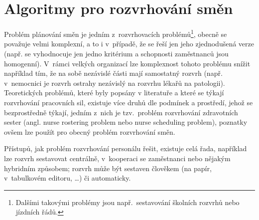 \documentclass[twoside]{ctuthesis}
\begin{document}
%
%
%


\chapter{Algoritmy pro rozvrhování směn}
Problém plánování směn je jedním z~rozvrhovacích problémů\footnote{Dalšími takovými problémy jsou např.~sestavování školních rozvrhů nebo jízdních řádů.}, obecně se považuje velmi komplexní, a to i v~případě, že se řeší jen jeho zjednodušená verze (např. se vyhodnocuje jen jedno kritérium a schopnosti zaměstnanců jsou homogenní). V~rámci velkých organizací lze komplexnost tohoto problému snížit například tím, že na sobě nezávislé části mají samostatný rozvrh (např. v~nemocnici je rozvrh ostrahy nezávislý na rozvrhu lékařů na patologii). Teoretických problémů, které byly popsány v literatuře a které se týkají rozvrhování pracovních sil, existuje více druhů dle podmínek a prostředí, jehož se bezprostředně týkají, jedním z~nich je tzv.~problém rozvrhování zdravotních sester (angl. nurse rostering problem nebo nurse scheduling problem), poznatky ovšem lze použít pro obecný problém rozvrhování směn.

Přístupů, jak problém rozvrhování personálu řešit, existuje celá řada, například lze rozvrh sestavovat centrálně, v~kooperaci se zaměstnanci nebo nějakým hybridním způsobem; rozvrh může být sestaven člověkem (na papír, v~tabulkovém editoru, \ldots) či automaticky.
\end{document}
